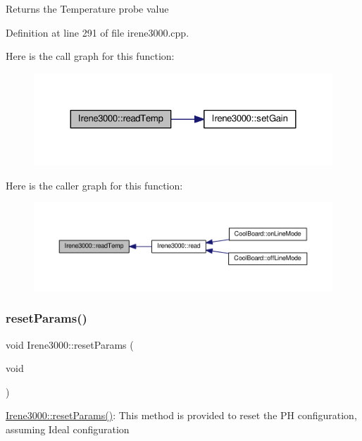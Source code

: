 \begin{DoxyReturn}{Returns}
the Temperature probe value 
\end{DoxyReturn}


Definition at line 291 of file irene3000.\+cpp.

Here is the call graph for this function\+:
\nopagebreak
\begin{figure}[H]
\begin{center}
\leavevmode
\includegraphics[width=324pt]{d6/d03/class_irene3000_a94ad40f281d83ad1be20bf1edd6fe802_cgraph}
\end{center}
\end{figure}
Here is the caller graph for this function\+:
\nopagebreak
\begin{figure}[H]
\begin{center}
\leavevmode
\includegraphics[width=350pt]{d6/d03/class_irene3000_a94ad40f281d83ad1be20bf1edd6fe802_icgraph}
\end{center}
\end{figure}
\mbox{\label{class_irene3000_a0fba280e8b7c881307efa31281aa691d}} 
\subsubsection{\texorpdfstring{reset\+Params()}{resetParams()}}
{\footnotesize\ttfamily void Irene3000\+::reset\+Params (\begin{DoxyParamCaption}\item[{void}]{ }\end{DoxyParamCaption})}

\hyperlink{class_irene3000_a0fba280e8b7c881307efa31281aa691d}{Irene3000\+::reset\+Params()}\+: This method is provided to reset the PH configuration, assuming Ideal configuration 

